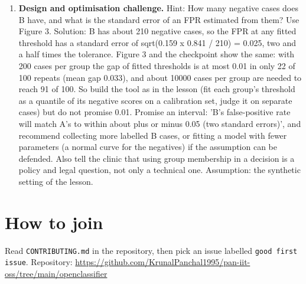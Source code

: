 \documentclass[11pt,a4paper]{article}
\begin{document}
\begin{enumerate}[nosep]
\item \textbf{Design and optimisation challenge.} Hint: How many negative cases does B have, and what is the standard error of an FPR estimated from them? Use Figure 3. Solution: B has about 210 negative cases, so the FPR at any fitted threshold has a standard error of sqrt(0.159 x 0.841 / 210) = 0.025, two and a half times the tolerance. Figure 3 and the checkpoint show the same: with 200 cases per group the gap of fitted thresholds is at most 0.01 in only 22 of 100 repeats (mean gap 0.033), and about 10000 cases per group are needed to reach 91 of 100. So build the tool as in the lesson (fit each group's threshold as a quantile of its negative scores on a calibration set, judge it on separate cases) but do not promise 0.01. Promise an interval: 'B's false-positive rate will match A's to within about plus or minus 0.05 (two standard errors)', and recommend collecting more labelled B cases, or fitting a model with fewer parameters (a normal curve for the negatives) if the assumption can be defended. Also tell the clinic that using group membership in a decision is a policy and legal question, not only a technical one. Assumption: the synthetic setting of the lesson.
\end{enumerate}

\section{How to join}
Read \texttt{CONTRIBUTING.md} in the repository, then pick an issue labelled \texttt{good first issue}. Repository: \url{https://github.com/KrunalPanchal1995/pan-iit-oss/tree/main/openclassifier}
\end{document}
